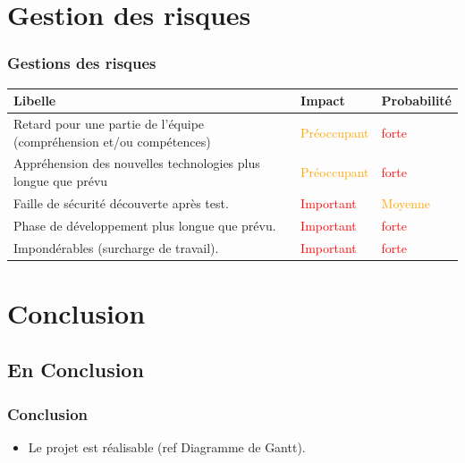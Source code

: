 \documentclass[xcolor=table]{beamer}
\begin{document}
\section{Gestion des risques}
\begin{frame}[fragile]
\frametitle{Gestions des risques}
  \begin{center}
  \begin{tabular}{| p{5cm} | p{2cm} |p{2cm} |}
  \hline
  \rowcolor{lightgray}Libelle & Impact & Probabilité\\ \hline
  Retard pour une partie de l'équipe (compréhension et/ou compétences) & \textcolor{orange}{Préoccupant} & \textcolor{red}{forte}\\ \hline
  Appréhension des nouvelles technologies plus longue que prévu & \textcolor{orange}{Préoccupant} & \textcolor{red}{forte}\\ \hline
  Faille de sécurité découverte après test. & \textcolor{red}{Important} & \textcolor{orange}{Moyenne}\\ \hline
  Phase de développement plus longue que prévu.& \textcolor{red}{Important} & \textcolor{red}{forte}\\ \hline
  Impondérables (surcharge de travail).& \textcolor{red}{Important} & \textcolor{red}{forte}\\ \hline
  \end{tabular}
  \end{center}
\end{frame}

\section{Conclusion}

\subsection{En Conclusion}

\begin{frame}
\frametitle{Conclusion}
  \begin{itemize}
   \item Le projet est réalisable (ref Diagramme de Gantt).
  \end{itemize}

\end{frame}



\end{document}
